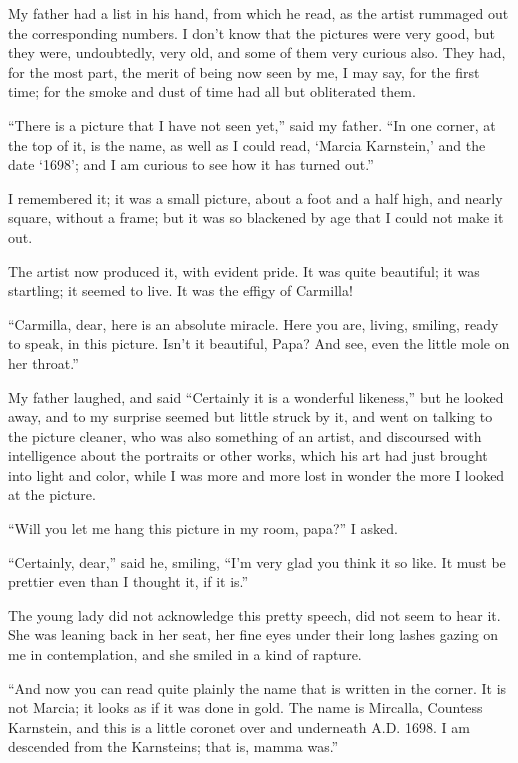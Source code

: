 \documentclass[11pt,twoside,makeidx,hidelinks,]{memoir}
\begin{document}
My father had a list in his hand, from which he read, as the artist
rummaged out the corresponding numbers. I don't know that the pictures
were very good, but they were, undoubtedly, very old, and some of them
very curious also. They had, for the most part, the merit of being now
seen by me, I may say, for the first time; for the smoke and dust of
time had all but obliterated them.

``There is a picture that I have not seen yet,'' said my father. ``In one
corner, at the top of it, is the name, as well as I could read, `Marcia
Karnstein,' and the date `1698'; and I am curious to see how it has
turned out.''

I remembered it; it was a small picture, about a foot and a half high,
and nearly square, without a frame; but it was so blackened by age that
I could not make it out.

The artist now produced it, with evident pride. It was quite beautiful;
it was startling; it seemed to live. It was the effigy of Carmilla!

``Carmilla, dear, here is an absolute miracle. Here you are, living,
smiling, ready to speak, in this picture. Isn't it beautiful, Papa? And
see, even the little mole on her throat.''

My father laughed, and said ``Certainly it is a wonderful likeness,'' but
he looked away, and to my surprise seemed but little struck by it, and
went on talking to the picture cleaner, who was also something of an
artist, and discoursed with intelligence about the portraits or other
works, which his art had just brought into light and color, while I was
more and more lost in wonder the more I looked at the picture.

``Will you let me hang this picture in my room, papa?'' I asked.

``Certainly, dear,'' said he, smiling, ``I'm very glad you think it so
like. It must be prettier even than I thought it, if it is.''

The young lady did not acknowledge this pretty speech, did not seem to
hear it. She was leaning back in her seat, her fine eyes under their
long lashes gazing on me in contemplation, and she smiled in a kind
of rapture.

``And now you can read quite plainly the name that is written in the
corner. It is not Marcia; it looks as if it was done in gold. The name
is Mircalla, Countess Karnstein, and this is a little coronet over and
underneath A.D. 1698. I am descended from the Karnsteins; that is,
mamma was.''
\end{document}
